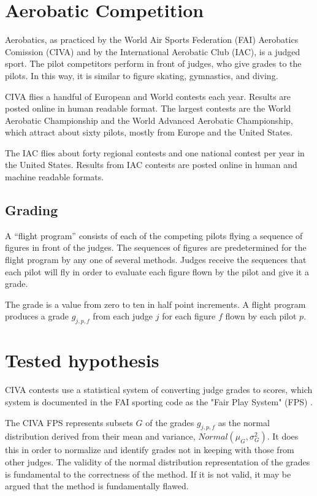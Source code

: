 \section{Aerobatic Competition}

Aerobatics, as practiced by the World Air Sports Federation (FAI)
Aerobatics Comission (CIVA) and by the International Aerobatic Club (IAC),
is a judged sport. The pilot competitors perform in front of judges, who
give grades to the pilots. In this way, it is similar to figure skating,
gymnastics, and diving.

CIVA flies a handful of European and World contests each year.
Results are posted online \cite{civa-results} in human readable format.
The largest contests are the World Aerobatic Championship \cite{wac}
and the World Advanced Aerobatic Championship, which attract about sixty
pilots, mostly from Europe and the United States.

The IAC flies about forty regional contests and one national contest
per year in the United States.
Results from IAC contests are posted online \cite{iaccdb}
in human and machine readable formats.

\subsection{Grading}

A ``flight program'' consists of each of the competing pilots flying a sequence
of figures in front of the judges. The sequences of figures are predetermined
for the flight program by any one of several methods.
Judges receive the sequences that each pilot will fly in order to evaluate
each figure flown by the pilot and give it a grade.

The grade is a value from zero to ten in half point increments.
A flight program produces a grade $g_{j,p,f}$
from each judge $j$ for each figure $f$ flown by each pilot $p$.

\section{Tested hypothesis}

CIVA contests use a statistical system of converting judge grades to scores,
which system is documented in the FAI sporting code as the "Fair Play System"
(FPS) \cite{fps}.

The CIVA FPS represents subsets $G$ of the grades $g_{j,p,f}$
as the normal distribution derived from their mean and variance,
$Normal(\mu_G, \sigma^2_G)$.
It does this in order to normalize and
identify grades not in keeping with those from other judges.
The validity of the normal distribution
representation of the grades is fundamental to the correctness of the
method.  If it is not valid, it may be argued that the method is fundamentally
flawed.

